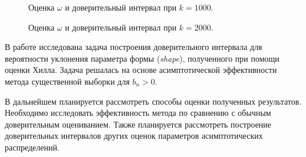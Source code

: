 \documentclass[12pt, specialist, subf, substylefile = spbu.rtx]{disser}
\begin{document}
\begin{figure}[h]
\caption{Оценка $\omega$ и доверительный интервал при $k=1000$.}
\label{ris:dover1}
\end{figure}

\begin{figure}[h]
\caption{Оценка $\omega$ и доверительный интервал при $k=2000$.}
\label{ris:dover2}
\end{figure}


\conclusion

В работе исследована задача построения доверительного интервала для вероятности уклонения параметра формы (\textit{shape}), полученного при помощи оценки Хилла. Задача решалась на основе асимптотической эффективности метода существенной выборки для $b_n>0$.

В дальнейшем планируется рассмотреть способы оценки полученных результатов. Необходимо исследовать эффективность метода по сравнению с обычным доверительным оцениванием. Также планируется рассмотреть построение доверительных интервалов других оценок параметров асимптотических распределений. 





\end{document}
